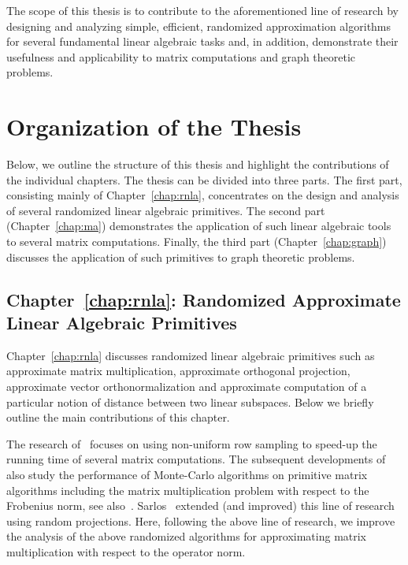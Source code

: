 %
The scope of this thesis is to contribute to the aforementioned line of research by designing and analyzing simple, efficient, randomized approximation algorithms for several fundamental linear algebraic tasks and, in addition, demonstrate their usefulness and applicability to matrix computations and graph theoretic problems.

%
\section{Organization of the Thesis}
Below, we outline the structure of this thesis and highlight the contributions of the individual chapters. The thesis can be divided into three parts. The first part, consisting mainly of Chapter~\ref{chap:rnla}, concentrates on the design and analysis of several randomized linear algebraic primitives. The second part (Chapter~\ref{chap:ma}) demonstrates the application of such linear algebraic tools to several matrix computations. Finally, the third part (Chapter~\ref{chap:graph}) discusses the application of such primitives to graph theoretic problems.
\subsection*{Chapter~\ref{chap:rnla}: Randomized Approximate Linear Algebraic Primitives}
%
Chapter~\ref{chap:rnla} discusses randomized linear algebraic primitives such as approximate matrix multiplication, approximate orthogonal projection, approximate vector orthonormalization and approximate computation of a particular notion of distance between two linear subspaces. Below we briefly outline the main contributions of this chapter.
%

%
The research of~\cite{lowrank:FKV} focuses on using non-uniform row sampling to speed-up the running time of several matrix computations. The subsequent developments of~\cite{matrixmult:drineas,lowrank:drineas, matrixdecomp:drineas} also study the performance of Monte-Carlo algorithms on primitive matrix algorithms including the matrix multiplication problem with respect to the Frobenius norm, see also~\cite{lowrank:rankone:VR}. Sarlos~\cite{sarlos} extended (and improved) this line of research using random projections. Here, following the above line of research, we improve the analysis of the above randomized algorithms for approximating matrix multiplication with respect to the operator norm.
%

